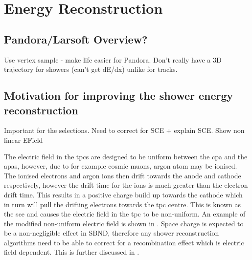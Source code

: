 \chapter{Energy Reconstruction}
\label{chap:Energy Reco}

\section{Pandora/Larsoft Overview?}

Use vertex sample - make life easier for Pandora.
Don't really have a 3D trajectory for showers (can't get dE/dx) unlike for tracks.

\section{Motivation for improving the shower energy reconstruction}
Important for the selections. 
Need to correct for SCE + explain SCE. Show non linear EField

The electric field in the \Glspl{tpc} are designed to be uniform between the \Gls{cpa} and the \Glspl{apa}, however, due to for example cosmic muons, argon atom may be ionised. The ionised electrons and argon ions then drift towards the anode and cathode respectively, however the drift time for the ions is much greater than the electron drift time. This results in a positive charge build up towards the cathode which in turn will pull the drifting electrons towards the \Gls{tpc} centre. This is known as the \Gls{sce} and causes the electric field in the \Gls{tpc} to be non-uniform. An example of the modified non-uniform electric field is shown in . Space charge is expected to be a non-negligible effect in SBND, therefore any shower reconstruction algorithms need to be able to correct for a recombination effect which is electric field dependent. This is further discussed in .

